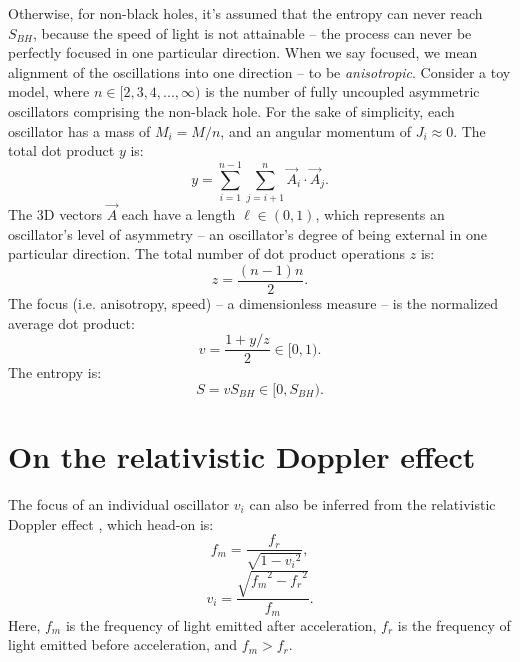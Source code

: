 \documentclass[12pt]{article}
\begin{document}
Otherwise, for non-black holes, it's assumed that the entropy can never reach $S_{BH}$, because the speed of light is not attainable -- the process can never be perfectly focused in one particular direction.
When we say focused, we mean alignment of the oscillations into one direction -- to be \textit{anisotropic}.
Consider a toy model, where $n \in [2, 3, 4, ..., \infty)$ is the number of fully uncoupled asymmetric oscillators comprising the non-black hole.
For the sake of simplicity, each oscillator has a mass of $M_i = M/n$, and an angular momentum of $J_i \approx 0$.
The total dot product $y$ is:
\begin{equation}
y = \sum_{i = 1}^{n - 1}  \sum_{j = i + 1}^{n} {\vec{A}}_i  \cdot {\vec{A}}_j.
\end{equation}
The 3D vectors ${\vec{A}}$ each have a length $\ell \in (0, 1)$, which represents an oscillator's level of asymmetry -- an oscillator's degree of being external in one particular direction.
The total number of dot product operations $z$ is:
\begin{equation}
z = \frac{(n - 1)n}{2}.
\end{equation}
The focus (i.e. anisotropy, speed) -- a dimensionless measure -- is the normalized average dot product:
\begin{equation}
v = \frac{1 + {y}/{z}}{2} \in [0, 1).
\end{equation}
The entropy is:
\begin{equation}
S = v S_{BH} \in [0,  S_{BH}).
\end{equation}



\section{On the relativistic Doppler effect}

The focus of an individual oscillator $v_i$ can also be inferred from the relativistic Doppler effect \cite{ae}, which head-on is:
\begin{equation}
f_m = \frac{f_r}{\sqrt{1 - {v_i}^2}},
\end{equation}
\begin{equation}
v_i = \frac{\sqrt{{f_m}^2 - {f_r}^2}}{f_m}.
\end{equation}
Here, $f_m$ is the frequency of light emitted after acceleration, $f_r$ is the frequency of light emitted before acceleration, and $f_m > f_r$.
\end{document}
